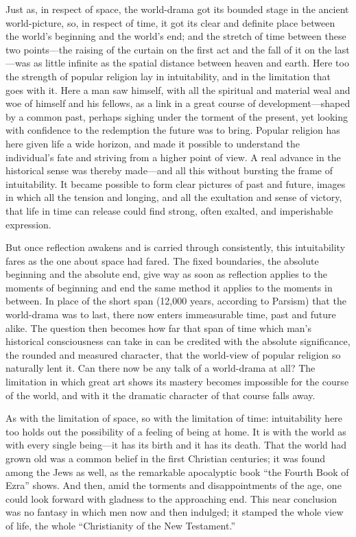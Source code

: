 \documentclass[12pt,a4paper]{article}
\newcommand{\opage}[1]{\marginnote{\footnotesize\textit{[#1]}}}
\begin{document}
Just as, in respect of space, the world-drama got its bounded stage in the ancient
world-picture, so, in respect of time, it got its clear and definite place between
the world's beginning and the world's end; and the stretch of time between these
two points---the raising of the curtain on the first act and the fall of it on the
last---was as little infinite as the spatial distance between heaven and earth.
Here too the strength of popular religion lay in intuitability, and in the
limitation that goes with it. Here a man saw himself, with all the spiritual and
material weal and woe of himself and his fellows, as a link in a great course of
development---shaped by a common past, perhaps sighing under the torment of the
present, yet looking with confidence to the redemption the future was to bring.
Popular religion has here given life a wide horizon, and made it possible to
understand the individual's fate and striving from a higher point of view. A real
advance in the historical sense was thereby made---and all this without bursting
the frame of intuitability. It became possible to form clear pictures of past and
future, images in which all the tension and longing, and all the exultation and
sense of victory, that life in time can release could find strong, often exalted,
and imperishable expression.

But once reflection awakens and is carried through consistently, \opage{15}this intuitability
fares as the one about space had fared. The fixed boundaries, the absolute
beginning and the absolute end, give way as soon as reflection applies to the
moments of beginning and end the same method it applies to the moments in between.
In place of the short span (12,000 years, according to Parsism) that the
world-drama was to last, there now enters immeasurable time, past and future alike.
The question then becomes how far that span of time which man's historical
consciousness can take in can be credited with the absolute significance, the
rounded and measured character, that the world-view of popular religion so
naturally lent it. Can there now be any talk of a world-drama at all? The
limitation in which great art shows its mastery becomes impossible for the course
of the world, and with it the dramatic character of that course falls away.

As with the limitation of space, so with the limitation of time: intuitability
here too holds out the possibility of a feeling of being at home. It is with the
world as with every single being---it has its birth and it has its death. That the
world had grown old was a common belief in the first Christian centuries; it was
found among the Jews as well, as the remarkable apocalyptic book ``the Fourth Book
of Ezra'' shows. And then, amid the torments and disappointments of the age, one
could look forward with gladness to the approaching end. This near conclusion was
no fantasy in which men now and then indulged; it stamped the whole view of life,
the whole ``Christianity of the New Testament.''
\end{document}
